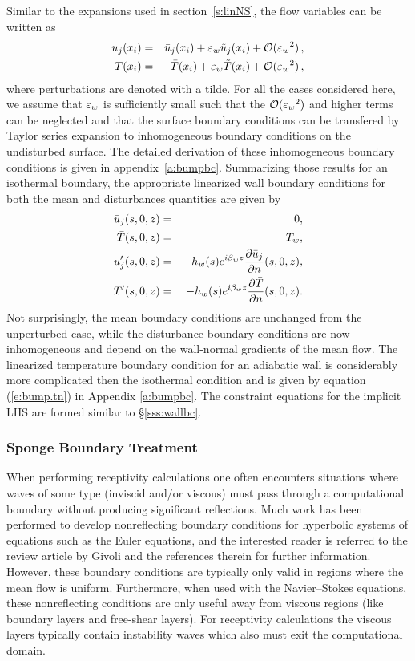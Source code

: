 Similar to the expansions used in section~\ref{s:linNS}, the flow variables
can be written as
%
\begin{eqnarray}
    u_j(x_i) &=& \bar u_j(x_i) + {\varepsilon_w} \tilde u_j(x_i) + 
                 {\cal O}({\varepsilon_w}^2) {\, ,} \\
      T(x_i) &=& \bar T(x_i)   + {\varepsilon_w} \tilde T(x_i) +   
                 {\cal O}({\varepsilon_w}^2) {\, ,}
\end{eqnarray}
%
where perturbations are denoted with a tilde.  For all the cases considered
here, we assume that ${\varepsilon_w}$ is sufficiently small such that the ${\cal O}({\varepsilon_w}^2)$ and
higher terms can be neglected and that the surface boundary conditions can be
transfered by Taylor series expansion to inhomogeneous boundary conditions on
the undisturbed surface.  The detailed derivation of these inhomogeneous
boundary conditions is given in appendix~\ref{a:bumpbc}.  Summarizing those
results for an isothermal boundary, the appropriate linearized wall boundary
conditions for both the mean and disturbances quantities are given by
%
\begin{eqnarray}
  \bar u_j(s,0,z) &=& 0, \\
  \bar T(s,0,z)   &=& T_w, \\
  u'_j(s,0,z)     &=& -h_w(s) e^{i {\beta_{w}} z} 
                       \frac{\partial \bar u_j}{\partial n}(s,0,z), \\
  T'(s,0,z)       &=& -h_w(s) e^{i {\beta_{w}} z} 
                       \frac{\partial \bar T}{\partial n}(s,0,z) .
\end{eqnarray}
%
Not surprisingly, the mean boundary conditions are unchanged from the
unperturbed case, while the disturbance boundary conditions are now
inhomogeneous and depend on the wall-normal gradients of the mean flow.  The
linearized temperature boundary condition for an adiabatic wall is
considerably more complicated then the isothermal condition and is given by
equation (\ref{e:bump.tn}) in Appendix \ref{a:bumpbc}.  The constraint
equations for the implicit LHS are formed similar to \S\ref{sss:wallbc}.

\subsubsection{Sponge Boundary Treatment \label{sss:sponge} }

When performing receptivity calculations one often encounters situations where
waves of some type (inviscid and/or viscous) must pass through a computational
boundary without producing significant reflections.  Much work has been
performed to develop nonreflecting boundary conditions for hyperbolic systems
of equations such as the Euler equations, and the interested reader is
referred to the review article by Givoli \cite{Givoli:91} and the references
therein for further information.  However, these boundary conditions are
typically only valid in regions where the mean flow is uniform. Furthermore,
when used with the Navier--Stokes equations, these nonreflecting conditions are
only useful away from viscous regions (like boundary layers and free-shear
layers).  For receptivity calculations the viscous layers typically contain
instability waves which also must exit the computational domain.
%
%

